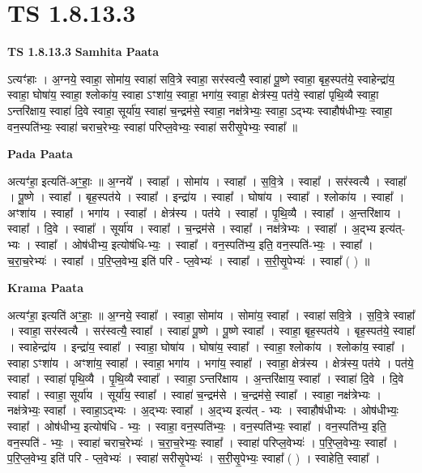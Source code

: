 \documentclass[17pt]{extarticle}
\begin{document}
\section{ TS 1.8.13.3 }

\textbf{TS 1.8.13.3 } \newline
\textbf{Samhita Paata} \newline

ऽत्यꣳ॑हाः । अ॒ग्नये॒ स्वाहा॒ सोमा॑य॒ स्वाहा॑ सवि॒त्रे स्वाहा॒ सर॑स्वत्यै॒ स्वाहा॑ पू॒ष्णे स्वाहा॒ बृह॒स्पत॑ये॒ स्वाहेन्द्रा॑य॒ स्वाहा॒ घोषा॑य॒ स्वाहा॒ श्लोका॑य॒ स्वाहा ऽꣳशा॑य॒ स्वाहा॒ भगा॑य॒ स्वाहा॒ क्षेत्र॑स्य॒ पत॑ये॒ स्वाहा॑ पृथि॒व्यै स्वाहा॒ ऽन्तरि॑क्षाय॒ स्वाहा॑ दि॒वे स्वाहा॒ सूर्या॑य॒ स्वाहा॑ च॒न्द्रम॑से॒ स्वाहा॒ नक्ष॑त्रेभ्यः॒ स्वाहा॒ ऽद्भ्यः स्वाहौष॑धीभ्यः॒ स्वाहा॒ वन॒स्पति॑भ्यः॒ स्वाहा॑ चराच॒रेभ्यः॒ स्वाहा॑ परिप्ल॒वेभ्यः॒ स्वाहा॑ सरीसृ॒पेभ्यः॒ स्वाहा᳚ ॥ \newline

\textbf{Pada Paata} \newline

अत्यꣳ॑हा॒ इत्यति॑-अꣳ॒॒हाः॒ ॥ अ॒ग्नये᳚ । स्वाहा᳚ । सोमा॑य । स्वाहा᳚ । स॒वि॒त्रे । स्वाहा᳚ । सर॑स्वत्यै । स्वाहा᳚ । पू॒ष्णे । स्वाहा᳚ । बृह॒स्पत॑ये । स्वाहा᳚ । इन्द्रा॑य । स्वाहा᳚ । घोषा॑य । स्वाहा᳚ । श्लोका॑य । स्वाहा᳚ । अꣳशा॑य । स्वाहा᳚ । भगा॑य । स्वाहा᳚ । क्षेत्र॑स्य । पत॑ये । स्वाहा᳚ । पृ॒थि॒व्यै । स्वाहा᳚ । अ॒न्तरि॑क्षाय । स्वाहा᳚ । दि॒वे । स्वाहा᳚ । सूर्या॑य । स्वाहा᳚ । च॒न्द्रम॑से । स्वाहा᳚ । नक्ष॑त्रेभ्यः । स्वाहा᳚ । अ॒द्भ्य इत्य॑त्-भ्यः । स्वाहा᳚ । ओष॑धीभ्य॒ इत्योष॑धि-भ्यः॒ । स्वाहा᳚ । वन॒स्पति॑भ्य॒ इति॒ वन॒स्पति॑-भ्यः॒ । स्वाहा᳚ । च॒रा॒च॒रेभ्यः॑ । स्वाहा᳚ । प॒रि॒प्ल॒वेभ्य॒ इति॑ परि - प्ल॒वेभ्यः॑ । स्वाहा᳚ । स॒री॒सृ॒पेभ्यः॑ । स्वाहा᳚ ( ) ॥  \newline


\textbf{Krama Paata} \newline

अत्यꣳ॑हा॒ इत्यति॑ अꣳ॒॒हाः॒ ॥ अ॒ग्नये॒ स्वाहा᳚ । स्वाहा॒ सोमा॑य । सोमा॑य॒ स्वाहा᳚ । स्वाहा॑ सवि॒त्रे । स॒वि॒त्रे स्वाहा᳚ । स्वाहा॒ सर॑स्वत्यै । सर॑स्वत्यै॒ स्वाहा᳚ । स्वाहा॑ पू॒ष्णे । पू॒ष्णे स्वाहा᳚ । स्वाहा॒ बृह॒स्पत॑ये । बृह॒स्पत॑ये॒ स्वाहा᳚ । स्वाहेन्द्रा॑य । इन्द्रा॑य॒ स्वाहा᳚ । स्वाहा॒ घोषा॑य । घोषा॑य॒ स्वाहा᳚ । स्वाहा॒ श्लोका॑य । श्लोका॑य॒ स्वाहा᳚ । स्वाहा ऽꣳशा॑य । अꣳशा॑य॒ स्वाहा᳚ । स्वाहा॒ भगा॑य । भगा॑य॒ स्वाहा᳚ । स्वाहा॒ क्षेत्र॑स्य । क्षेत्र॑स्य॒ पत॑ये । पत॑ये॒ स्वाहा᳚ । स्वाहा॑ पृथि॒व्यै । पृ॒थि॒व्यै स्वाहा᳚ । स्वाहा॒ ऽन्तरि॑क्षाय । अ॒न्तरि॑क्षाय॒ स्वाहा᳚ । स्वाहा॑ दि॒वे । दि॒वे स्वाहा᳚ । स्वाहा॒ सूर्या॑य । सूर्या॑य॒ स्वाहा᳚ । स्वाहा॑ च॒न्द्रम॑से । च॒न्द्रम॑से॒ स्वाहा᳚ । स्वाहा॒ नक्ष॑त्रेभ्यः । नक्ष॑त्रेभ्यः॒ स्वाहा᳚ । स्वाहा॒ऽद्भ्यः । अ॒द्भ्यः स्वाहा᳚ । अ॒द्भ्य इत्य॑त् - भ्यः । स्वाहौष॑धीभ्यः । ओष॑धीभ्यः॒ स्वाहा᳚ । ओष॑धीभ्य॒ इत्योष॑धि - भ्यः॒ । स्वाहा॒ वन॒स्पति॑भ्यः॒ । वन॒स्पति॑भ्यः॒ स्वाहा᳚ । वन॒स्पति॑भ्य॒ इति॒ वन॒स्पति॑ - भ्यः॒ । स्वाहा॑ चराच॒रेभ्यः॑ । च॒रा॒च॒रेभ्यः॒ स्वाहा᳚ । स्वाहा॑ परिप्ल॒वेभ्यः॑ । प॒रि॒प्ल॒वेभ्यः॒ स्वाहा᳚ । प॒रि॒प्ल॒वेभ्य॒ इति॑ परि - प्ल॒वेभ्यः॑ । स्वाहा॑ सरीसृ॒पेभ्यः॑ । स॒री॒सृ॒पेभ्यः॒ स्वाहा᳚ ( ) । स्वाहेति॒ स्वाहा᳚ । \newline
\end{document}
